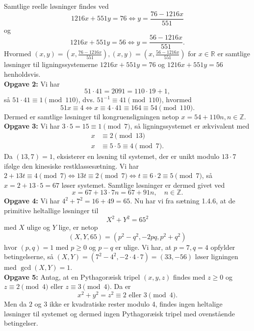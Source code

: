 \documentclass[a4paper]{article}
\begin{document}
Samtlige reelle løsninger findes ved
\[
    1216 x + 551 y = 76
    \iff y = \frac{76-1216x}{551}
\]
og
\[
1216 x + 551 y = 56 \iff y = \frac{56-1216x}{551}
.\] 
Hvormed $(x,y) = \left( x, \frac{76-1216x}{551} \right) , (x,y)=(x,
\frac{56-1216x}{551})$ for $x \in \mathbb{R}$ er samtlige løsninger til
ligningssystemerne
$1216x+551y=76$ og $1216x+551y=56$ henholdsvis.\\
\linebreak
\textbf{Opgave 2:} 
Vi har
\[
51 \cdot 41 = 2091 = 110\cdot 19 + 1,
\] 
så $51 \cdot 41 \equiv 1 \pmod{110}$, dvs. $51^{-1} \equiv 41 \pmod{110}$,
hvormed
\[
    51 x \equiv 4 \iff x \equiv 4 \cdot 41 \equiv 164 \equiv 54 \pmod{110}
.\] 
Dermed er samtlige løsninger til kongruensligningen netop $x=54 +110n, n \in
\mathbb{Z}$.\\
\linebreak
\textbf{Opgave 3:} Vi har $3 \cdot 5 = 15 \equiv 1 \pmod{7}$, så
ligningssystemet er ækvivalent med
\begin{align*}
    x &\equiv 2 \pmod{13}\\
    x &\equiv 5\cdot 5 \equiv 4 \pmod{7}
.\end{align*}
Da $(13,7)=1$, eksisterer en løsning til systemet, der er unikt modulo $13\cdot
7$
ifølge den kinesiske restklassesætning.
Vi har $2 + 13 t \equiv 4 \pmod{7} \iff 13 t \equiv 2 \pmod{7} \iff t \equiv
6\cdot 2 \equiv 5 \pmod{7}$, så
$x = 2+13\cdot 5 = 67$ løser systemet. Samtlige løsninger er dermed givet ved
\[
x = 67 + 13\cdot 7 n = 67 + 91 n, \quad n \in \mathbb{Z}
.\] 
\textbf{Opgave 4:} Vi har $4^2 + 7^2 = 16 + 49 = 65$. Nu har vi fra sætning
1.4.6, at de primitive heltallige løsninger til
\[
X^2 + Y^2 = 65^2
\] 
med $X$ ulige og $Y$ lige, er netop
\[
    (X,Y,65) = \left( p^2 - q^2 , -2pq, p^2 + q^2 \right) \] 
hvor $(p,q)=1$ med  $p\ge 0$ og $p-q$ er ulige. Vi har, at $p=7, q=4$ opfylder
betingelserne, så $(X,Y) = \left( 7^2 - 4^2, -2\cdot 4\cdot 7 \right)
=(33,-56)$ løser ligningen med $\gcd(X,Y)=1$.\\
\linebreak
\textbf{Opgave 5:} Antag, at en Pythagoræisk tripel $(x,y,z)$ findes med
$z \ge 0$ og $ z\equiv 2 \pmod{4}$ eller $z\equiv 3 \pmod{4}$. Da er
\[
    x^2 + y^2 = z^2 \equiv 2 \text{ eller } 3 \pmod{4}
.\] 
Men da $2$ og $3$ ikke er kvadratiske rester modulo 4, findes ingen heltalige
løsninger til systemet og dermed ingen Pythagoræisk tripel med ovenstående
betingelser.
\end{document}
